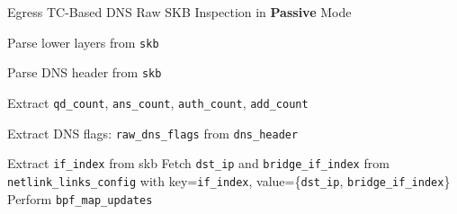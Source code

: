 \documentclass [11pt, proquest] {uwthesis}[2020/02/24]
\begin{document}
\begin{algorithm}[htbp]
\caption{Egress TC-Based DNS Raw SKB Inspection in \textbf{Passive} Mode}
\label{sec:alg4}

\small
{}


Parse lower layers from \texttt{skb}\;

Parse DNS header from \texttt{skb}\;

Extract \texttt{qd\_count}, \texttt{ans\_count}, \texttt{auth\_count}, \texttt{add\_count}\;


Extract DNS flags: \texttt{raw\_dns\_flags} from \texttt{dns\_header}\;



Extract \texttt{if\_index} from skb\;
Fetch \texttt{dst\_ip} and \texttt{bridge\_if\_index} from \texttt{netlink\_links\_config} with key=\texttt{if\_index}, value=\{\texttt{dst\_ip}, \texttt{bridge\_if\_index}\}\;
Perform \texttt{bpf\_map\_updates}\;

\end{algorithm}
\end{document}
